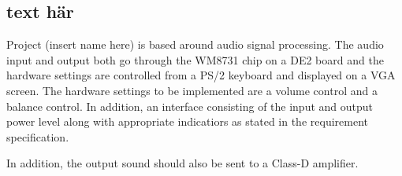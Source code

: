 \subsection{text här}

Project (insert name here) is based around audio signal processing. The audio input and output both go through the WM8731 chip on a DE2 board and the hardware settings are controlled from a PS/2 keyboard and displayed on a VGA screen. The hardware settings to be implemented are a volume control and a balance control. In addition, an interface consisting of the input and output power level along with appropriate indicatiors as stated in the requirement specification.

In addition, the output sound should also be sent to a Class-D amplifier.
